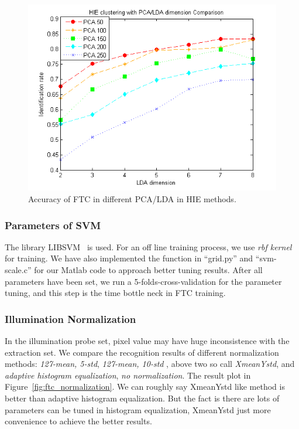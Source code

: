 \documentclass[10pt,twocolumn,letterpaper]{article}
\begin{document}
\begin{figure}[t]
    \begin{center}
        \includegraphics[width=0.8\linewidth]{fig/ftc/ftc_hie.png}
    \end{center}
    \caption{Accuracy of FTC in different PCA/LDA in HIE methods.}
    \label{fig:ftc_hie}
\end{figure}


\subsubsection{Parameters of SVM}
The library LIBSVM~\cite{CC01a} is used. For an off line training process,
we use {\it rbf kernel} for training. We have also implemented the function in
``grid.py'' and ``svm-scale.c'' for our Matlab code to approach better
tuning results. After all parameters have been set, we run a 
5-folds-cross-validation for the parameter tuning, and this step is the time bottle
neck in FTC training.

\subsubsection{Illumination Normalization}
In the illumination probe set, pixel value may have huge inconsistence with
the extraction set. We compare the recognition results of different
normalization methods: {\it 127-mean, 5-std}, {\it 127-mean, 10-std}
, above two so call {\it XmeanYstd}, and
{\it adaptive histogram equalization}, {\it no normalization}.
The result plot in Figure~\ref{fig:ftc_normalization}.
We can roughly say XmeanYstd like method is better than adaptive histogram
equalization. But the fact is there are lots of parameters can be tuned in
histogram equalization, XmeanYstd just more convenience to achieve the
better results.
\end{document}
